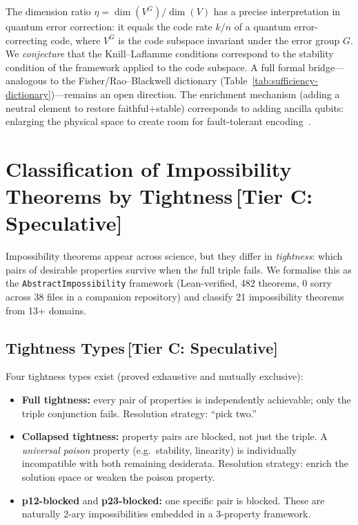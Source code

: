 \documentclass[11pt,a4paper]{article}
\begin{document}
The dimension ratio $\eta = \dim(V^G)/\dim(V)$ has a precise interpretation in quantum error correction: it equals the code rate $k/n$ of a quantum error-correcting code, where $V^G$ is the code subspace invariant under the error group $G$.  We \emph{conjecture} that the Knill--Laflamme conditions correspond to the stability condition of the framework applied to the code subspace.  A full formal bridge---analogous to the Fisher/Rao--Blackwell dictionary (Table~\ref{tab:sufficiency-dictionary})---remains an open direction.  The enrichment mechanism (adding a neutral element to restore faithful+stable) corresponds to adding ancilla qubits: enlarging the physical space to create room for fault-tolerant encoding~\citep{knill1997theory}.

\section{Classification of Impossibility Theorems by Tightness\,\textnormal{\normalsize[Tier C: Speculative]}}
\label{sec:classification}

Impossibility theorems appear across science, but they differ in \emph{tightness}: which pairs of desirable properties survive when the full triple fails.  We formalise this as the \texttt{AbstractImpossibility} framework (Lean-verified, 482 theorems, 0 sorry across 38 files in a companion repository) and classify 21 impossibility theorems from 13+ domains.

\subsection{Tightness Types\,\textnormal{\normalsize[Tier C: Speculative]}}

Four tightness types exist (proved exhaustive and mutually exclusive):
\begin{itemize}
  \item \textbf{Full tightness:} every pair of properties is independently achievable; only the triple conjunction fails.  Resolution strategy: ``pick two.''
  \item \textbf{Collapsed tightness:} property pairs are blocked, not just the triple.  A \emph{universal poison} property (e.g.\ stability, linearity) is individually incompatible with both remaining desiderata.  Resolution strategy: enrich the solution space or weaken the poison property.
  \item \textbf{p12-blocked} and \textbf{p23-blocked:} one specific pair is blocked.  These are naturally 2-ary impossibilities embedded in a 3-property framework.
\end{itemize}
\end{document}
